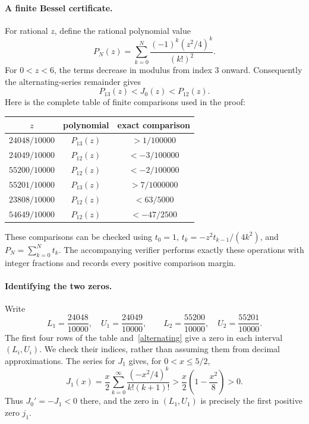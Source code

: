 \documentclass[11pt]{article}
\newcommand{\J}{J_0}
\begin{document}
\paragraph{A finite Bessel certificate.}
For rational \(z\), define the rational polynomial value
\[
 P_N(z)=\sum_{k=0}^N\frac{(-1)^k(z^2/4)^k}{(k!)^2}.
\]
For \(0<z<6\), the terms decrease in modulus from index \(3\) onward.
Consequently the alternating-series remainder gives
\begin{equation}\label{alternating}
 P_{13}(z)<\J(z)<P_{12}(z).
\end{equation}
Here is the complete table of finite comparisons used in the proof:
\begin{center}
\begin{tabular}{ccc}
\toprule
\(z\) & polynomial & exact comparison\\
\midrule
\(24048/10000\) & \(P_{13}(z)\) & \(>1/100000\)\\
\(24049/10000\) & \(P_{12}(z)\) & \(<-3/100000\)\\
\(55200/10000\) & \(P_{12}(z)\) & \(<-2/100000\)\\
\(55201/10000\) & \(P_{13}(z)\) & \(>7/1000000\)\\
\(23808/10000\) & \(P_{12}(z)\) & \(<63/5000\)\\
\(54649/10000\) & \(P_{12}(z)\) & \(<-47/2500\)\\
\bottomrule
\end{tabular}
\end{center}
These comparisons can be checked using
\(t_0=1\), \(t_k=-z^2t_{k-1}/(4k^2)\), and
\(P_N=\sum_{k=0}^Nt_k\). The accompanying verifier performs exactly
these operations with integer fractions and records every positive
comparison margin.

\paragraph{Identifying the two zeros.}
Write
\[
 L_1=\frac{24048}{10000},\quad U_1=\frac{24049}{10000},
 \qquad L_2=\frac{55200}{10000},\quad U_2=\frac{55201}{10000}.
\]
The first four rows of the table and~\eqref{alternating} give a zero
in each interval \((L_i,U_i)\). We check their indices, rather than
assuming them from decimal approximations.
The series for \(J_1\) gives, for \(0<x\le5/2\),
\[
 J_1(x)=\frac{x}{2}\sum_{k=0}^\infty
       \frac{(-x^2/4)^k}{k!(k+1)!}
 >\frac{x}{2}\left(1-\frac{x^2}{8}\right)>0.
\]
Thus \(\J'=-J_1<0\) there, and the zero in \((L_1,U_1)\)
is precisely the first positive zero \(j_1\).
\end{document}
